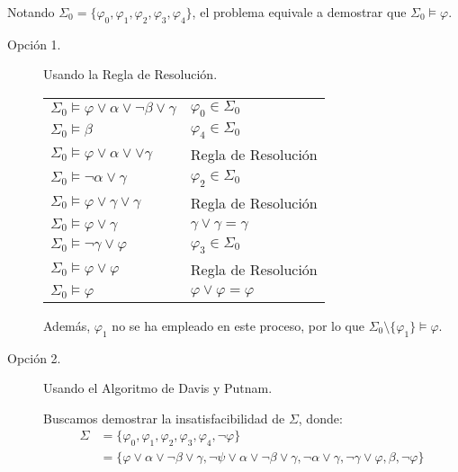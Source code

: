 \begin{ejercicio}
    Notando $\Sigma_0=\{\varphi_0,\varphi_1,\varphi_2,\varphi_3,\varphi_4\}$, el problema equivale a demostrar que $\Sigma_0\vDash \varphi$.
    \begin{description}
        \item[Opción 1.] Usando la Regla de Resolución.
        
        \begin{table}[H]
            \centering
            \begin{tabular}{ll}
                $\Sigma_0\vDash \varphi\lor \alpha\lor \lnot \beta \lor \gamma$ & $\varphi_0\in \Sigma_0$\\
                $\Sigma_0\vDash \beta$ & $\varphi_4\in \Sigma_0$\\
                $\Sigma_0\vDash \varphi\lor \alpha\lor \lor \gamma$ & Regla de Resolución\\
                $\Sigma_0\vDash \lnot \alpha\lor \gamma$ & $\varphi_2\in \Sigma_0$\\
                $\Sigma_0\vDash \varphi\lor \gamma\lor \gamma$ & Regla de Resolución\\
                $\Sigma_0\vDash \varphi\lor \gamma$ & $\gamma\lor \gamma= \gamma$\\
                $\Sigma_0\vDash \lnot \gamma\lor \varphi$ & $\varphi_3\in \Sigma_0$\\
                $\Sigma_0\vDash \varphi \lor \varphi$ & Regla de Resolución\\
                $\Sigma_0\vDash \varphi$ & $\varphi\lor \varphi = \varphi$
            \end{tabular}
        \end{table}

        Además, $\varphi_1$ no se ha empleado en este proceso, por lo que $\Sigma_0\setminus \{\varphi_1\}\vDash \varphi$.

        \item[Opción 2.] Usando el Algoritmo de Davis y Putnam.
        
        Buscamos demostrar la insatisfacibilidad de $\Sigma$, donde:
        \begin{align*}
            \Sigma &= \{\varphi_0,\varphi_1,\varphi_2,\varphi_3,\varphi_4, \lnot \varphi\}\\
            &= \{\varphi\lor \alpha\lor \lnot \beta \lor \gamma, \lnot \psi\lor \alpha\lor \lnot \beta\lor \gamma, \lnot \alpha\lor \gamma, \lnot \gamma\lor \varphi, \beta,\lnot \varphi\}
        \end{align*}


\end{description}
\end{ejercicio}
